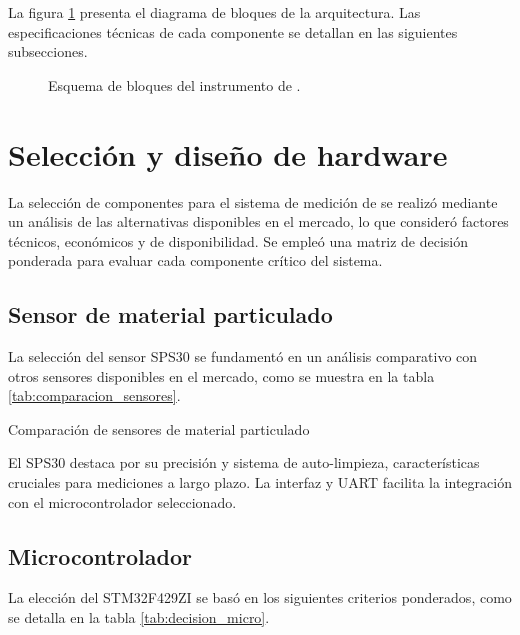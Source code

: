 La figura \ref{fig:diagBloques2} presenta el diagrama de bloques de la arquitectura. Las especificaciones técnicas de cada componente se detallan en las siguientes subsecciones.

\begin{figure}[h]
	\center
	
	\caption{Esquema de bloques del instrumento de \MPF.}
	\label{fig:diagBloques2}
\end{figure}

\pagebreak

\section{Selección y diseño de hardware}	


La selección de componentes para el sistema de medición de \MPF se realizó mediante un análisis de las alternativas disponibles en el mercado, lo que consideró factores técnicos, económicos y de disponibilidad. Se empleó una matriz de decisión ponderada para evaluar cada componente crítico del sistema.

\subsection{Sensor de material particulado}

La selección del sensor SPS30 se fundamentó en un análisis comparativo con otros sensores disponibles en el mercado, como se muestra en la tabla \ref{tab:comparacion_sensores}.

\begin{table}[htbp]
	\centering
	\small
	\caption{Comparación de sensores de material particulado}
	\label{tab:comparacion_sensores}

\end{table}

El SPS30 destaca por su precisión y sistema de auto-limpieza, características cruciales para mediciones a largo plazo. La interfaz \IIC y UART facilita la integración con el microcontrolador seleccionado.

\newpage
\subsection{Microcontrolador}

La elección del STM32F429ZI se basó en los siguientes criterios ponderados, como se detalla en la tabla \ref{tab:decision_micro}.

